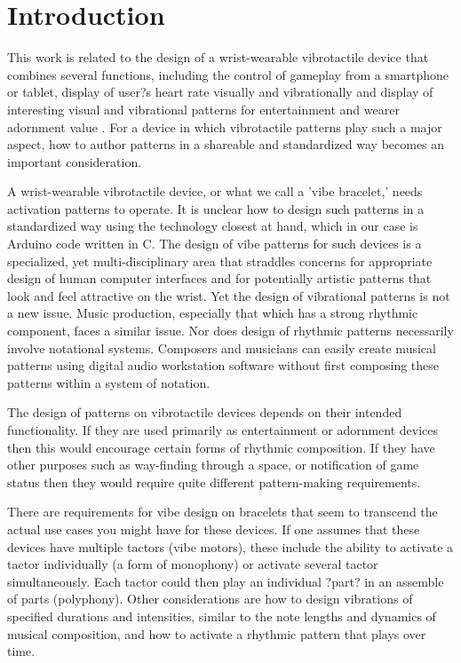 \documentclass[a4paper, twocolumn]{article}
\begin{document}
\section{Introduction}
This work is related to the design of a wrist-wearable vibrotactile device that combines several functions, including the control of gameplay from a smartphone or tablet, display of user?s heart rate visually and vibrationally and display of interesting visual and vibrational patterns for entertainment and wearer adornment value \cite{tindale2014wearable}. For a device in which vibrotactile patterns play such a major aspect, how to author patterns in a shareable and standardized way becomes an important consideration. 

A wrist-wearable vibrotactile device, or what we call a 'vibe bracelet,' needs activation patterns to operate. It is unclear how to design such patterns in a standardized way using the technology closest at hand, which in our case is Arduino code written in C. The design of vibe patterns for such devices is a specialized, yet multi-disciplinary area that straddles concerns for appropriate design of human computer interfaces and for potentially artistic patterns that look and feel attractive on the wrist. Yet the design of vibrational patterns is not a new issue. Music production, especially that which has a strong rhythmic component, faces a similar issue. Nor does design of rhythmic patterns necessarily involve notational systems. Composers and musicians can easily create musical patterns using digital audio workstation software without first composing these patterns within a system of notation. 

The design of patterns on vibrotactile devices depends on their intended functionality. If they are used primarily as entertainment or adornment devices then this would encourage certain forms of rhythmic composition. If they have other purposes such as way-finding through a space, or notification of game status then they would require quite different pattern-making requirements. 

There are requirements for vibe design on bracelets that seem to transcend the actual use cases you might have for these devices. If one assumes that these devices have multiple tactors (vibe motors), these include the ability to activate a tactor individually (a form of monophony) or activate several tactor simultaneously. Each tactor could then play an individual ?part? in an assemble of parts (polyphony). Other considerations are how to design vibrations of specified durations and intensities, similar to the note lengths and dynamics of musical composition, and how to activate a rhythmic pattern that plays over time. 
\end{document}
